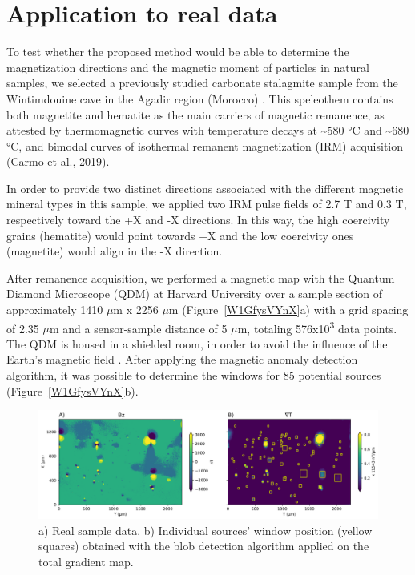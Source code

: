 \section{Application to real data}

To test whether the proposed method would be able to determine the
magnetization directions and the magnetic moment of particles in natural
samples, we selected a previously studied carbonate stalagmite sample from the
Wintimdouine cave in the Agadir region (Morocco) \citep{Ait2019Hydro}. This
speleothem contains both magnetite and hematite as the main carriers of
magnetic remanence, as attested by thermomagnetic curves with temperature
decays at {\textasciitilde}580 °C and {\textasciitilde}680 °C, and bimodal
curves of isothermal remanent magnetization (IRM) acquisition (Carmo et al.,
2019).

In order to provide two distinct directions associated with the different
magnetic mineral types in this sample, we applied two IRM pulse fields of 2.7 T
and 0.3 T, respectively toward the +X and -X directions. In this way, the high
coercivity grains (hematite) would point towards +X and the low coercivity ones
(magnetite) would align in the -X direction.

After remanence acquisition, we performed a magnetic map with the Quantum
Diamond Microscope (QDM) at Harvard University over a sample section of
approximately 1410 $\mu$m x 2256 $\mu$m (Figure~\ref{W1GfysVYnX}a) with a grid
spacing of 2.35 $\mu$m and a sensor-sample distance of 5 $\mu$m, totaling
576x10\textsuperscript{3} data points. The QDM is housed in a shielded room, in
order to avoid the influence of the Earth's magnetic field \citep{Fu2020,
Glenn2017}. After applying the magnetic anomaly detection algorithm, it was
possible to determine the windows for 85 potential sources
(Figure~\ref{W1GfysVYnX}b).

\begin{figure}[tb]
\centering
\includegraphics[width=1\linewidth]{figures/RealData.png}
\caption{
a) Real sample data. b) Individual sources' window position (yellow squares)
obtained with the blob detection algorithm applied on the total gradient map.
}
\label{w1gfysvynx}
\end{figure}

